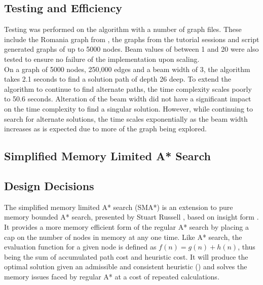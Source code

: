 \documentclass[]{article}
\begin{document}
\subsection*{Testing and Efficiency}

Testing was performed on the algorithm with a number of graph files. These include the Romania graph from \cite{norvig}, the graphs from the tutorial sessions and script generated graphs of up to 5000 nodes. Beam values of between 1 and 20 were also tested to ensure no failure of the implementation upon scaling.\\

On a graph of 5000 nodes, 250,000 edges and a beam width of 3, the algorithm takes 2.1 seconds to find a solution path of depth 26 deep. To extend the algorithm to continue to find alternate paths, the time complexity scales poorly to 50.6 seconds. Alteration of the beam width did not have a significant impact on the time complexity to find a singular solution. However, while continuing to search for alternate solutions, the time scales exponentially as the beam width increases as is expected due to more of the graph being explored.

\vspace{1cm}
\begin{center}
	\section*{Simplified Memory Limited A* Search}
\end{center}

\vspace*{0.8cm}
\subsection*{Design Decisions}

The simplified memory limited A* search (SMA*) is an extension to pure memory bounded A* search, presented by Stuart Russell \cite{russell_paper}, based on insight form \cite{chakra}. It provides a more memory efficient form of the regular A* search by placing a cap on the number of nodes in memory at any one time. Like A* search, the evaluation function for a given node is defined as $f(n)=g(n)+h(n)$, thus being the sum of accumulated path cost and heuristic cost. It will produce the optimal solution given an admissible and consistent heuristic (\cite{norvig}) and solves the memory issues faced by regular A* at a cost of repeated calculations. \\
\end{document}
